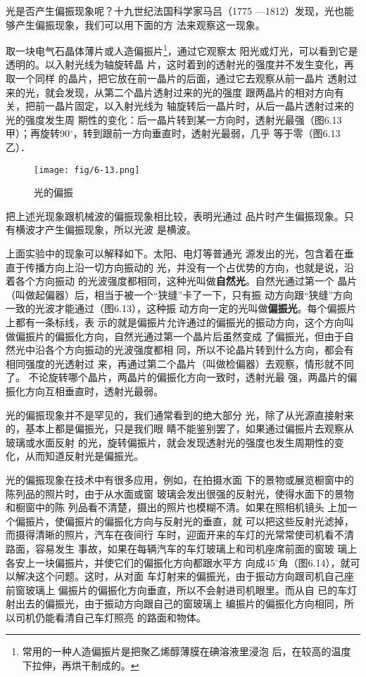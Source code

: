 光是否产生偏振现象呢？十九世纪法国科学家马吕（1775
—1812）发现，光也能够产生偏振现象，我们可以用下面的方
法来观察这一现象。

取一块电气石晶体薄片或人造偏振片\footnote{常用的一种人造偏振片是把聚乙烯醇薄膜在碘溶液里浸泡
后，在较高的温度下拉伸，再烘干制成的。}，通过它观察太
阳光或灯光，可以看到它是透明的。以入射光线为轴旋转晶
片，这时着到的透射光的强度并不发生变化，再取一个同样
的晶片，把它放在前一晶片的后面，通过它去观察从前一晶片
透射过来的光，就会发现，从第二个晶片透射过来的光的强度
跟两晶片的相对方向有关，把前一晶片固定，以入射光线为
轴旋转后一晶片时，从后一晶片透射过来的光的强度发生周
期性的变化：后一晶片转到某一方向时，透射光最强（图6.13
甲）；再旋转90$^\circ$，转到跟前一方向垂直时，透射光最弱，几乎
等于零（图6.13乙）．
\begin{figure}[htp]\centering
    \texttt{[image: fig/6-13.png]}
    \caption{光的偏振}
    \end{figure}

把上述光现象跟机械波的偏振现象相比较，表明光通过
品片时产生偏振现象。只有横波才产生偏振现象，所以光波
是横波。

上面实验中的现象可以解释如下。太阳、电灯等普通光
源发出的光，包含着在垂直于传播方向上沿一切方向振动的
光，并没有一个占优势的方向，也就是说，沿着各个方向振动
的光波强度都相同，这种光叫做\textbf{自然光}。自然光通过第一个
晶片（叫做起偏器）后，相当于被一个“狭缝”卡了一下，只有振
动方向跟“狭缝”方向一致的光波才能通过（图6.13），这种振
动方向一定的光叫做\textbf{偏振光}。每个偏振片上都有一条标线，表
示的就是偏振片允许通过的偏振光的振动方向，这个方向叫
做偏振片的偏振化方向，自然光通过第一个晶片后虽然变成
了偏振光，但由于自然光中沿各个方向振动的光波强度都相
同，所以不论晶片转到什么方向，都会有相同强度的光透射过
来，再通过第二个晶片（叫做检偏器）去观察，情形就不同了。
不论旋转哪个晶片，两晶片的偏振化方向一致时，透射光最
强，两晶片的偏振化方向互相垂直时，透射光最弱。

光的偏振现象并不是罕见的，我们通常看到的绝大部分
光，除了从光源直接射来的，基本上都是偏振光，只是我们眼
睛不能鉴别罢了，如果通过偏振片去观察从玻璃或水面反射
的光，旋转偏振片，就会发现透射光的强度也发生周期性的变
化，从而知道反射光是偏振光。

光的偏振现象在技术中有很多应用，例如，在拍摄水面
下的景物或展览橱窗中的陈列品的照片时，由于从水面或窗
玻璃会发出很强的反射光，使得水面下的景物和橱窗中的陈
列品看不清楚，摄出的照片也模糊不清。如果在照相机镜头
上加一个偏振片，使偏振片的偏振化方向与反射光的垂直，就
可以把这些反射光滤掉，而摄得清晰的照片，汽车在夜间行
车时，迎面开来的车灯的光常常使司机看不清路面，容易发生
事故，如果在每辆汽车的车灯玻璃上和司机座席前面的窗玻
璃上各安上一块偏振片，并使它们的偏振化方向都跟水平方
向成45$^\circ$角（图6.14），就可以解决这个问题。这时，从对面
车灯射来的偏振光，由于振动方向跟司机自己座前窗玻璃上
偏振片的偏振化方向垂直，所以不会射进司机眼里。而从自
已的车灯射出去的偏振光，由于振动方向跟自己的窗玻璃上
编振片的偏振化方向相同，所以司机仍能看清自己车灯照亮
的路面和物体。

